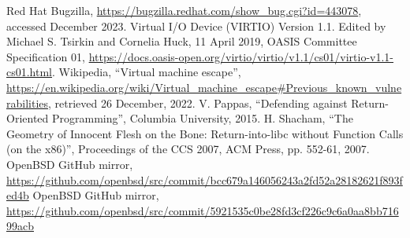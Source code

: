 \documentclass[conference]{IEEEtran}
\begin{document}
\vspace{5mm}
\begin{thebibliography}{00}
 Red Hat Bugzilla, \url{https://bugzilla.redhat.com/show_bug.cgi?id=443078}, accessed December 2023.
 Virtual I/O Device (VIRTIO) Version 1.1. Edited by Michael S. Tsirkin and Cornelia Huck, 11 April 2019, OASIS Committee Specification 01, \url{https://docs.oasis-open.org/virtio/virtio/v1.1/cs01/virtio-v1.1-cs01.html}.
 Wikipedia, ``Virtual machine escape'', \url{https://en.wikipedia.org/wiki/Virtual_machine_escape#Previous_known_vulnerabilities}, retrieved 26 December, 2022.
   V. Pappas, ``Defending against Return-Oriented Programming'', Columbia University, 2015.
 H. Shacham, ``The Geometry of Innocent Flesh on the Bone:
  Return-into-libc without Function Calls (on the x86)'', Proceedings of the CCS 2007, ACM Press, pp. 552-61, 2007.
 OpenBSD GitHub mirror, \url{https://github.com/openbsd/src/commit/bcc679a146056243a2fd52a28182621f893fed4b}
 OpenBSD GitHub mirror, \url{https://github.com/openbsd/src/commit/5921535c0be28fd3cf226c9c6a0aa8bb71699acb}
\end{thebibliography}
\end{document}
